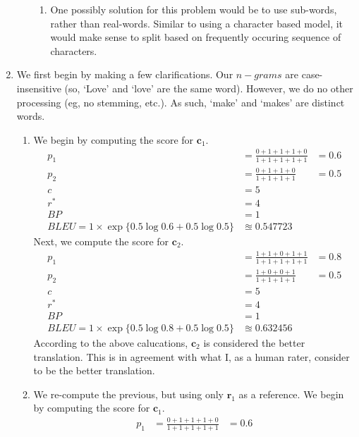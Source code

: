 \documentclass[12pt]{article}
\begin{document}
\begin{enumerate}[label=(\alph*)]
\begin{itemize}
\begin{enumerate}[label=\arabic*]
          \item One possibly solution for this problem would be to use sub-words, rather than real-words. Similar to using a character based model, it would make sense to split based on frequently occuring sequence of characters.
        \end{enumerate}
    \end{itemize}
  \item We first begin by making a few clarifications. Our $n-grams$ are case-insensitive (so, `Love' and `love' are the same word). However, we do no other processing (eg, no stemming, etc.). As such, `make' and `makes' are distinct words.
    \begin{enumerate}[label=\roman*]
      \item We begin by computing the score for $\bm{c}_1$.
        \begin{align*}
          p_1 &= \frac{0 + 1 + 1 + 1 + 0}{1 + 1 + 1 + 1 + 1} &= 0.6 \\
          p_2 &= \frac{0 + 1 + 1 + 0 }{1 + 1 + 1 + 1} &= 0.5  \\
          c &= 5 \\
          r^* &= 4 \\
          BP &= 1 \\
          BLEU = 1 \times \exp\{ 0.5\log 0.6 + 0.5\log 0.5  \} &\approxeq 0.547723
        \end{align*}
        Next, we compute the score for $\bm{c}_2$.
        \begin{align*}
          p_1 &= \frac{1 + 1 + 0 + 1 + 1}{1 + 1 + 1 + 1 + 1} &= 0.8 \\
          p_2 &= \frac{1 + 0 + 0 + 1 }{1 + 1 + 1 + 1} &= 0.5  \\
          c &= 5 \\
          r^* &= 4 \\
          BP &= 1 \\
          BLEU = 1 \times \exp\{ 0.5\log 0.8 + 0.5\log 0.5  \} &\approxeq 0.632456
        \end{align*}
        According to the above calucations, $\bm{c}_2$ is considered the better translation. This is in agreement with what I, as a human rater, consider to be the better translation.
      \item We re-compute the previous, but using only $\bm{r}_1$ as a reference. We begin by computing the score for $\bm{c}_1$.
        \begin{align*}
          p_1 &= \frac{0 + 1 + 1 + 1 + 0}{1 + 1 + 1 + 1 + 1} &= 0.6 \\

\end{align*}
\end{enumerate}
\end{enumerate}
\end{document}
